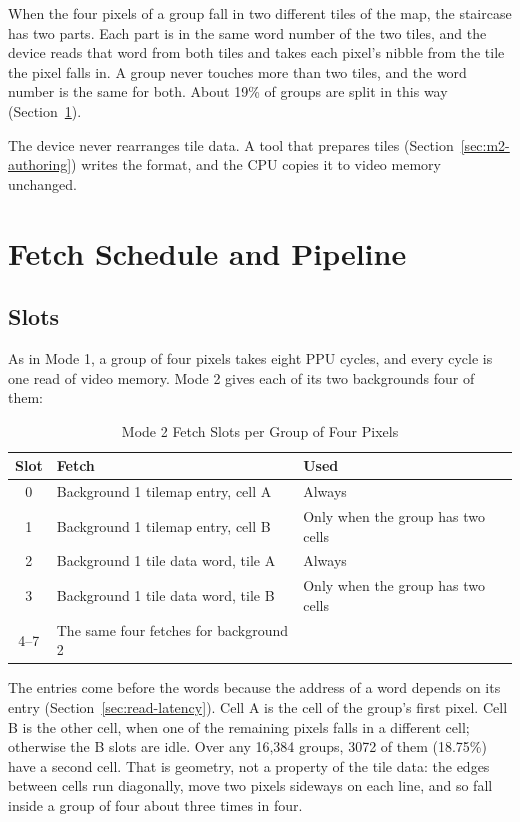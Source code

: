 When the four pixels of a group fall in two different tiles of the map, the staircase has two parts. Each part is in
the same word number of the two tiles, and the device reads that word from both tiles and takes each pixel's nibble
from the tile the pixel falls in. A group never touches more than two tiles, and the word number is the same for both.
About 19\% of groups are split in this way (Section~\ref{sec:m2-fetch}).

The device never rearranges tile data. A tool that prepares tiles (Section~\ref{sec:m2-authoring}) writes the format,
and the CPU copies it to video memory unchanged.

\section{Fetch Schedule and Pipeline}
\label{sec:m2-fetch}

\subsection{Slots}

As in Mode 1, a group of four pixels takes eight PPU cycles, and every cycle is one read of video memory. Mode 2 gives
each of its two backgrounds four of them:

\begin{table}[H]
	\centering
	\begin{tabular}{cll}
		\toprule
		\textbf{Slot} & \textbf{Fetch}                         & \textbf{Used}                     \\
		\midrule
		0             & Background 1 tilemap entry, cell A     & Always                            \\
		1             & Background 1 tilemap entry, cell B     & Only when the group has two cells \\
		2             & Background 1 tile data word, tile A    & Always                            \\
		3             & Background 1 tile data word, tile B    & Only when the group has two cells \\
		4--7          & The same four fetches for background 2 &                                   \\
		\bottomrule
	\end{tabular}
	\caption{Mode 2 Fetch Slots per Group of Four Pixels}
	\label{tab:m2-slots}
\end{table}

The entries come before the words because the address of a word depends on its entry (Section~\ref{sec:read-latency}).
Cell A is the cell of the group's first pixel. Cell B is the other cell, when one of the remaining pixels falls in a
different cell; otherwise the B slots are idle. Over any 16,384 groups, 3072 of them (18.75\%) have a second cell. That
is geometry, not a property of the tile data: the edges between cells run diagonally, move two pixels sideways on each
line, and so fall inside a group of four about three times in four.

